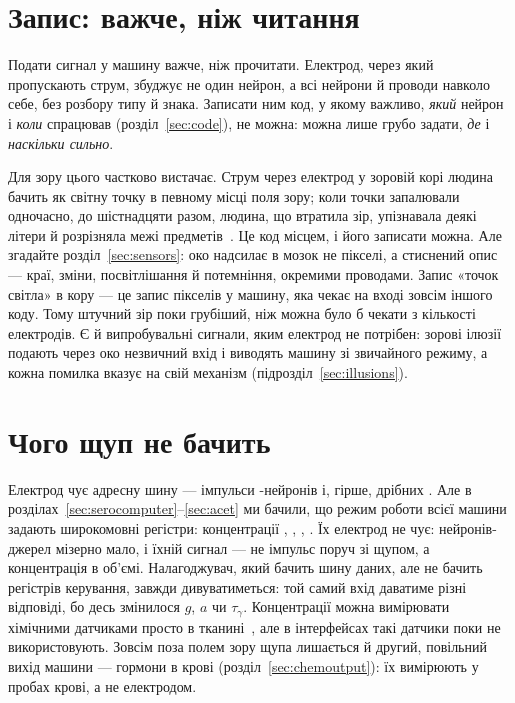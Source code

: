 \section{Запис: важче, ніж читання}

Подати сигнал у машину важче, ніж прочитати. Електрод, через який пропускають струм, збуджує не один нейрон, а всі нейрони й проводи навколо себе, без розбору типу й знака. Записати ним код, у якому важливо, \emph{який} нейрон і \emph{коли} спрацював (розділ~\ref{sec:code}), не можна: можна лише грубо задати, \emph{де} і \emph{наскільки сильно}.

Для зору цього частково вистачає. Струм через електрод у зоровій корі людина бачить як світну точку в певному місці поля зору; коли точки запалювали одночасно, до шістнадцяти разом, людина, що втратила зір, упізнавала деякі літери й розрізняла межі предметів~\cite{Fernandez2021}. Це код місцем, і його записати можна. Але згадайте розділ~\ref{sec:sensors}: око надсилає в мозок не пікселі, а стиснений опис --- краї, зміни, посвітлішання й потемніння, окремими проводами. Запис «точок світла» в кору --- це запис пікселів у машину, яка чекає на вході зовсім іншого коду. Тому штучний зір поки грубіший, ніж можна було б чекати з кількості електродів. Є й випробувальні сигнали, яким електрод не потрібен: зорові ілюзії подають через око незвичний вхід і виводять машину зі звичайного режиму, а кожна помилка вказує на свій механізм (підрозділ~\ref{sec:illusions}).

\section{Чого щуп не бачить}

Електрод чує адресну шину --- імпульси -нейронів і, гірше, дрібних . Але в розділах~\ref{sec:serocomputer}--\ref{sec:acet} ми бачили, що режим роботи всієї машини задають широкомовні регістри: концентрації , , , . Їх електрод не чує: нейронів-джерел мізерно мало, і їхній сигнал --- не імпульс поруч зі щупом, а концентрація в об'ємі. Налагоджувач, який бачить шину даних, але не бачить регістрів керування, завжди дивуватиметься: той самий вхід даватиме різні відповіді, бо десь змінилося $g$, $a$ чи $\tau_\gamma$. Концентрації можна вимірювати хімічними датчиками просто в тканині~\cite{Bunin1998}, але в інтерфейсах такі датчики поки не використовують. Зовсім поза полем зору щупа лишається й другий, повільний вихід машини --- гормони в крові (розділ~\ref{sec:chemoutput}): їх вимірюють у пробах крові, а не електродом.

